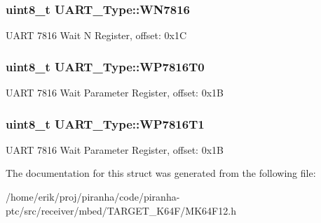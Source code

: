 \subsubsection[{\texorpdfstring{W\+N7816}{WN7816}}]{ uint8\+\_\+t U\+A\+R\+T\+\_\+\+Type\+::\+W\+N7816}\hypertarget{structUART__Type_a3c5baa7756fc680009fd014c7ffb6a0f}{}\label{structUART__Type_a3c5baa7756fc680009fd014c7ffb6a0f}
U\+A\+RT 7816 Wait N Register, offset\+: 0x1C 
\subsubsection[{\texorpdfstring{W\+P7816\+T0}{WP7816T0}}]{ uint8\+\_\+t U\+A\+R\+T\+\_\+\+Type\+::\+W\+P7816\+T0}\hypertarget{structUART__Type_ac028c928dc9241242a6d7779cdca9c54}{}\label{structUART__Type_ac028c928dc9241242a6d7779cdca9c54}
U\+A\+RT 7816 Wait Parameter Register, offset\+: 0x1B 
\subsubsection[{\texorpdfstring{W\+P7816\+T1}{WP7816T1}}]{ uint8\+\_\+t U\+A\+R\+T\+\_\+\+Type\+::\+W\+P7816\+T1}\hypertarget{structUART__Type_a1625db48274abc3bf18616664866b81c}{}\label{structUART__Type_a1625db48274abc3bf18616664866b81c}
U\+A\+RT 7816 Wait Parameter Register, offset\+: 0x1B 

The documentation for this struct was generated from the following file\+:\begin{DoxyCompactItemize}
\item 
/home/erik/proj/piranha/code/piranha-\/ptc/src/receiver/mbed/\+T\+A\+R\+G\+E\+T\+\_\+\+K64\+F/M\+K64\+F12.\+h\end{DoxyCompactItemize}
